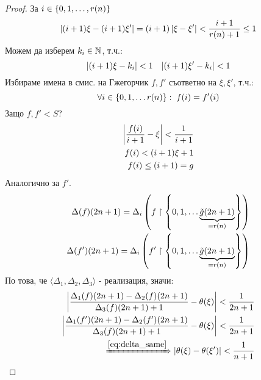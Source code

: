 \begin{proof}
    За $i \in \left\{0, 1, \dots, r(n)\right\}$
    \begin{equation}
        \left|(i+1)\xi - (i+1)\xi'\right| = (i+1) \left|\xi - \xi'\right| < \frac{i+1}{r(n) + 1} \leq 1
    \end{equation}
    Можем да изберем $k_i \in {\mathbb{N}}$, т.ч.:
    \begin{equation}
        \left|(i+1)\xi - k_i\right| < 1 \;\;\; \left|(i+1)\xi' - k_i\right| < 1
    \end{equation}
    Избираме имена в смис. на Гжегорчик $f, f'$ съответно на $\xi, \xi'$, т.ч.:
    \begin{equation}
        \forall i\in\left\{0, 1, \dots r(n)\right\}:\; f(i) = f'(i)
    \end{equation}
    Защо $f, f' < S$?
    \begin{equation}
        \begin{split}
            \left|\frac{f(i)}{i+1} - \xi\right| < \frac{1}{i+1} \\
            f(i) < (i + 1)\xi + 1                        \\
            f(i) \leq (i+1) = g
        \end{split}
    \end{equation}
    Аналогично за $f'$.
    \begin{equation}\label{eq:delta_same}
        \begin{split}
            \Delta(f)(2n+1) = \Delta_i\left(f \upharpoonright \left\{0, 1, \dots \underbrace{\tilde g(2n+1)}_{=r(n)}\right\}\right) \\
            \Delta(f')(2n+1) = \Delta_i\left(f' \upharpoonright \left\{0, 1, \dots \underbrace{\tilde g(2n+1)}_{=r(n)}\right\}\right)
        \end{split}
    \end{equation}
    По това, че $\langle \Delta_1, \Delta_2, \Delta_3\rangle$ - реализация, значи:
    \begin{equation}
        \begin{split}
            \left|\frac{\Delta_1(f)(2n+1) - \Delta_2(f)(2n+1)}{\Delta_3(f)(2n+1) + 1} - \theta(\xi)\right| < \frac{1}{2n+1} \\
            \left|\frac{\Delta_1(f')(2n+1) - \Delta_2(f')(2n+1)}{\Delta_3(f)(2n+1) + 1} - \theta(\xi)\right| < \frac{1}{2n+1} \\
            \xRightarrow{\eqref{eq:delta_same}} \left|\theta(\xi) - \theta(\xi')\right| < \frac{1}{n+1}
        \end{split}
    \end{equation}
\end{proof}

